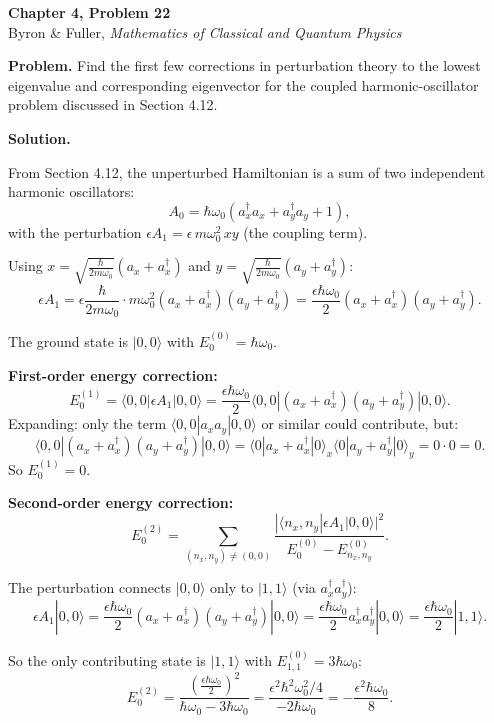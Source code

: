 \documentclass[12pt]{article}
\begin{document}
\begin{center}
{\Large\bfseries Chapter 4, Problem 22}\\[6pt]
Byron \& Fuller, \textit{Mathematics of Classical and Quantum Physics}
\end{center}

\bigskip

\textbf{Problem.} Find the first few corrections in perturbation theory to the lowest eigenvalue and corresponding eigenvector for the coupled harmonic-oscillator problem discussed in Section 4.12.

\bigskip
\textbf{Solution.}

From Section 4.12, the unperturbed Hamiltonian is a sum of two independent harmonic oscillators:
\[
A_0 = \hbar\omega_0(a_x^\dagger a_x + a_y^\dagger a_y + 1),
\]
with the perturbation $\epsilon A_1 = \epsilon\, m\omega_0^2\, xy$ (the coupling term).

Using $x = \sqrt{\frac{\hbar}{2m\omega_0}}(a_x + a_x^\dagger)$ and $y = \sqrt{\frac{\hbar}{2m\omega_0}}(a_y + a_y^\dagger)$:
\[
\epsilon A_1 = \epsilon\frac{\hbar}{2m\omega_0}\cdot m\omega_0^2 (a_x+a_x^\dagger)(a_y+a_y^\dagger) = \frac{\epsilon\hbar\omega_0}{2}(a_x+a_x^\dagger)(a_y+a_y^\dagger).
\]

The ground state is $|0,0\rangle$ with $E_0^{(0)} = \hbar\omega_0$.

\textbf{First-order energy correction:}
\[
E_0^{(1)} = \langle 0,0|\epsilon A_1|0,0\rangle = \frac{\epsilon\hbar\omega_0}{2}\langle 0,0|(a_x+a_x^\dagger)(a_y+a_y^\dagger)|0,0\rangle.
\]
Expanding: only the term $\langle 0,0|a_x a_y|0,0\rangle$ or similar could contribute, but:
\[
\langle 0,0|(a_x+a_x^\dagger)(a_y+a_y^\dagger)|0,0\rangle = \langle 0|a_x+a_x^\dagger|0\rangle_x\langle 0|a_y+a_y^\dagger|0\rangle_y = 0\cdot 0 = 0.
\]
So $E_0^{(1)} = 0$.

\textbf{Second-order energy correction:}
\[
E_0^{(2)} = \sum_{(n_x,n_y)\neq(0,0)} \frac{|\langle n_x,n_y|\epsilon A_1|0,0\rangle|^2}{E_0^{(0)} - E_{n_x,n_y}^{(0)}}.
\]

The perturbation connects $|0,0\rangle$ only to $|1,1\rangle$ (via $a_x^\dagger a_y^\dagger$):
\[
\epsilon A_1|0,0\rangle = \frac{\epsilon\hbar\omega_0}{2}(a_x+a_x^\dagger)(a_y+a_y^\dagger)|0,0\rangle = \frac{\epsilon\hbar\omega_0}{2}a_x^\dagger a_y^\dagger|0,0\rangle = \frac{\epsilon\hbar\omega_0}{2}|1,1\rangle.
\]

So the only contributing state is $|1,1\rangle$ with $E_{1,1}^{(0)} = 3\hbar\omega_0$:
\[
E_0^{(2)} = \frac{\left(\frac{\epsilon\hbar\omega_0}{2}\right)^2}{\hbar\omega_0 - 3\hbar\omega_0} = \frac{\epsilon^2\hbar^2\omega_0^2/4}{-2\hbar\omega_0} = -\frac{\epsilon^2\hbar\omega_0}{8}.
\]
\end{document}
